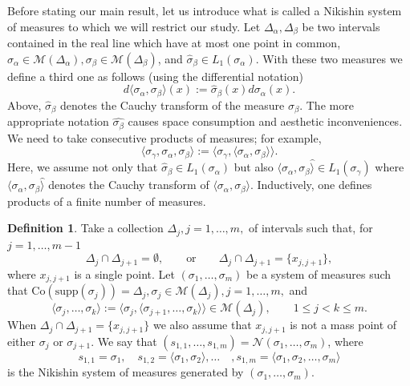 \documentclass[10pt,a4paper]{article}
\newcommand{\supp}{\mathrm{supp}}
\theoremstyle{definition}
\newtheorem{definition}[theorem]{Definition}
\theoremstyle{remark}
\numberwithin{equation}{section}
\begin{document}
Before stating our main result, let us introduce what is called a Nikishin system of measures to which we will restrict our study.
Let $\Delta_{\alpha}, \Delta_{\beta}$ be two intervals contained in the real line which have at most one point in common, $\sigma_{\alpha} \in {\mathcal{M}}(\Delta_{\alpha}), \sigma_{\beta} \in {\mathcal{M}}(\Delta_{\beta})$, and $\widehat{\sigma}_{\beta} \in L_1(\sigma_{\alpha})$. With these two measures we define a third one as follows (using the differential notation)
\[ d \langle \sigma_{\alpha},\sigma_{\beta} \rangle (x) := \widehat{\sigma}_{\beta}(x) d\sigma_{\alpha}(x).
\]
Above, $\widehat{\sigma}_{\beta}$ denotes the Cauchy transform of the measure $\sigma_{\beta}$.  The more appropriate notation $\widehat{\sigma_{\beta}}$ causes space consumption and aesthetic inconveniences. We need to take consecutive products of measures; for example,
\[\langle \sigma_{\gamma},  \sigma_{\alpha},\sigma_{\beta} \rangle :=\langle \sigma_{\gamma}, \langle \sigma_{\alpha},\sigma_{\beta} \rangle \rangle. \]
 Here, we assume not only that $\widehat{\sigma}_{\beta} \in L_1(\sigma_{\alpha})$ but also $\langle \sigma_{\alpha},\sigma_{\beta} \widehat{\rangle} \in L_1(\sigma_{\gamma})$ where $\langle \sigma_{\alpha},\sigma_{\beta} \widehat{\rangle}$ denotes the Cauchy transform of $\langle \sigma_{\alpha},\sigma_{\beta}  {\rangle}$. Inductively, one defines products of a finite number of measures.


\begin{definition} \label{Nikishin} Take a collection  $\Delta_j, j=1,\ldots,m,$ of intervals such that, for   $j=1,\ldots,m-1$
\[ \Delta_j \cap \Delta_{j+1} = \emptyset, \qquad \mbox{or} \qquad \Delta_j \cap \Delta_{j+1} = \{x_{j,j+1}\},
\]
where $x_{j,j+1}$ is a single point. Let $(\sigma_1,\ldots,\sigma_m)$ be a system of measures such that $\mbox{Co}(\supp (\sigma_j)) = \Delta_j, \sigma_j \in {\mathcal{M}}(\Delta_j), j=1,\ldots,m,$  and
\begin{equation} \label{eq:autom}
\langle \sigma_{j},\ldots,\sigma_k  {\rangle} := \langle \sigma_j,\langle \sigma_{j+1},\ldots,\sigma_k\rangle\rangle\in {\mathcal{M}}(\Delta_j),  \qquad  1 \leq j < k\leq m.
\end{equation}
When $\Delta_j \cap \Delta_{j+1} = \{x_{j,j+1}\}$ we also assume that $x_{j,j+1}$ is not a mass point of either $\sigma_j$ or $\sigma_{j+1}$.
We say that $(s_{1,1},\ldots,s_{1,m}) = {\mathcal{N}}(\sigma_1,\ldots,\sigma_m)$, where
\[ s_{1,1} = \sigma_1, \quad s_{1,2} = \langle \sigma_1,\sigma_2 \rangle, \ldots \quad , s_{1,m} = \langle \sigma_1, \sigma_2,\ldots,\sigma_m  \rangle
\]
is the Nikishin system of measures generated by $(\sigma_1,\ldots,\sigma_m)$.
\end{definition}
\end{document}

